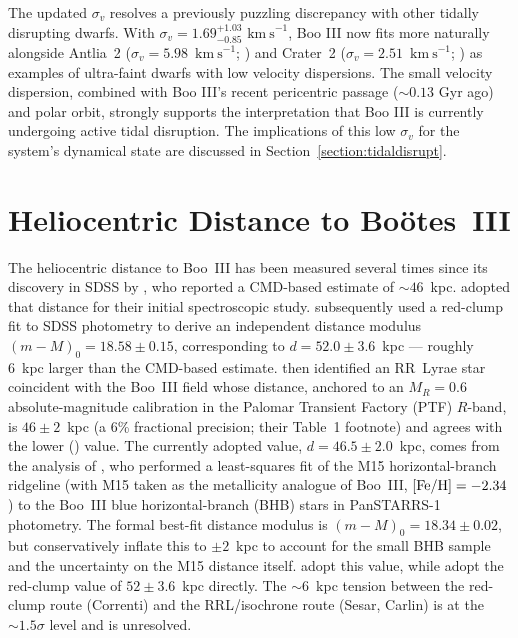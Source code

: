 \documentclass[twocolumn, apj, numberedappendix, appendixfloats]{openjournal_dhayaa}
\newcommand{\vlosUnits}{$\mathrm{km~s}^{-1}$\xspace}
\begin{document}
The updated $\sigma_v$ resolves a previously puzzling discrepancy with other tidally disrupting dwarfs. With $\sigma_{v} = 1.69^{+1.03}_{-0.85}$ \vlosUnits, Boo III now fits more naturally alongside Antlia~2 ($\sigma_v = 5.98$~\vlosUnits; \citealt{Ji2021}) and Crater~2 ($\sigma_v = 2.51$~\vlosUnits; \citealt{Limberg2025}) as examples of ultra-faint dwarfs with low velocity dispersions. The small velocity dispersion, combined with Boo III's recent pericentric passage ($\sim 0.13$ Gyr ago) and polar orbit, strongly supports the interpretation that Boo III is currently undergoing active tidal disruption. The implications of this low $\sigma_v$ for the system's dynamical state are discussed in Section~\ref{section:tidaldisrupt}.


\section{Heliocentric Distance to Boötes~III} \label{section:distance}

The heliocentric distance to Boo~III has been measured several times since its discovery in SDSS by \citet{Grillmair2009}, who reported a CMD-based estimate of $\sim 46$~kpc. \citet{Carlin2009} adopted that distance for their initial spectroscopic study. \citet{Correnti2009} subsequently used a red-clump fit to SDSS photometry to derive an independent distance modulus $(m-M)_0 = 18.58 \pm 0.15$, corresponding to $d = 52.0 \pm 3.6$~kpc --- roughly 6~kpc larger than the CMD-based estimate. \citet{Sesar2014} then identified an RR~Lyrae star coincident with the Boo~III field whose distance, anchored to an $M_R = 0.6$ absolute-magnitude calibration in the Palomar Transient Factory (PTF) $R$-band, is $46 \pm 2$~kpc (a 6\% fractional precision; their Table~1 footnote) and agrees with the lower (\citealt{Grillmair2009}) value. The currently adopted value, $d = 46.5 \pm 2.0$~kpc, comes from the analysis of \citet{Carlin2018}, who performed a least-squares fit of the M15 horizontal-branch ridgeline (with M15 taken as the metallicity analogue of Boo~III, $[{\rm Fe/H}] = -2.34$) to the Boo~III blue horizontal-branch (BHB) stars in PanSTARRS-1 photometry. The formal best-fit distance modulus is $(m-M)_0 = 18.34 \pm 0.02$, but \citet{Carlin2018} conservatively inflate this to $\pm 2$~kpc to account for the small BHB sample and the uncertainty on the M15 distance itself. \citet{Pace2022} adopt this value, while \citet{Moskowitz2020} adopt the \citet{Correnti2009} red-clump value of $52 \pm 3.6$~kpc directly. The $\sim 6$~kpc tension between the red-clump route (Correnti) and the RRL/isochrone route (Sesar, Carlin) is at the $\sim 1.5\sigma$ level and is unresolved.
\end{document}

